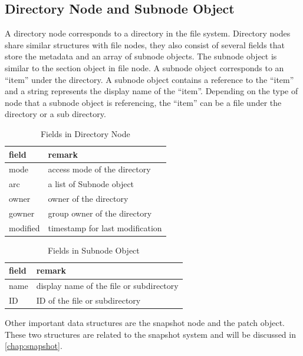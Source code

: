 \subsection{Directory Node and Subnode Object}

     A directory node corresponds to a directory in the file system. Directory nodes share similar structures with file nodes, they also consist of several fields that store the metadata and an array of subnode objects. The subnode object is similar to the section object in file node. A subnode object corresponds to an ``item'' under the directory. A subnode object contains a reference to the ``item'' and a string represents the display name of the ``item''. Depending on the type of node that a subnode object is referencing, the ``item'' can be a file under the directory or a sub directory.

\begin{table}[t]
\begin{center}
\begin{tabular}{ll}
\toprule
field & remark\\
\midrule
mode & access mode of the directory\\
arc & a list of Subnode object\\
owner & owner of the directory\\
gowner & group owner of the directory\\
modified & timestamp for last modification\\
\bottomrule
\end{tabular}
\end{center}
\caption{Fields in Directory Node}
\label{tab:dir_fields}
\end{table}

\begin{table}[t]
\begin{center}
\begin{tabular}{ll}
\toprule
field & remark\\
\midrule
name & display name of the file or subdirectory\\
ID & ID of the file or subdirectory\\
\bottomrule
\end{tabular}
\end{center}
\caption{Fields in Subnode Object}
\label{tab:subnode_fields}
\end{table}

    Other important data structures are the snapshot node and the patch object. These two structures are related to the snapshot system and will be discussed in \cref{chap:snapshot}.

